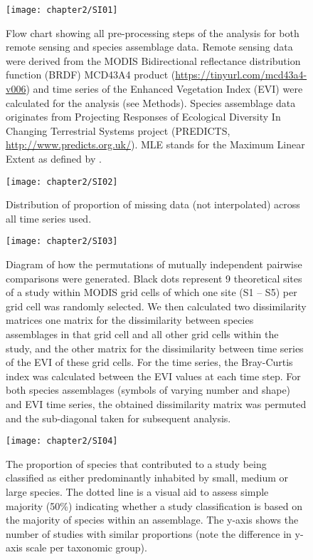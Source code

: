 \begin{figure}[h]
\centering
\texttt{[image: chapter2/SI01]}
\caption{ Flow chart showing all pre-processing steps of the analysis for both remote sensing and species assemblage data. Remote sensing data were derived from the MODIS Bidirectional reflectance distribution function (BRDF) MCD43A4 product (\href{https://tinyurl.com/mcd43a4-v006}{https://tinyurl.com/mcd43a4-v006}) and time series of the Enhanced Vegetation Index (EVI) were calculated for the analysis (see Methods). Species assemblage data originates from Projecting Responses of Ecological Diversity In Changing Terrestrial Systems project (PREDICTS, \href{http://www.predicts.org.uk/}{http://www.predicts.org.uk/}). MLE stands for the Maximum Linear Extent as defined by \citep{Hudson2016}.}
\label{SI02_01}
\end{figure}

\begin{figure}[h]
\centering
\texttt{[image: chapter2/SI02]}
\caption{ Distribution of proportion of missing data (not interpolated) across all time series used. }
\label{SI02_02}
\end{figure}

\begin{figure}[h]
\centering
\texttt{[image: chapter2/SI03]}
\caption{ Diagram of how the permutations of mutually independent pairwise comparisons were generated. Black dots represent 9 theoretical sites of a study within MODIS grid cells of which one site (S1 – S5) per grid cell was randomly selected. We then calculated two dissimilarity matrices one matrix for the dissimilarity between species assemblages in that grid cell and all other grid cells within the study, and the other matrix for the dissimilarity between time series of the EVI of these grid cells.  For the time series, the Bray-Curtis index was calculated between the EVI values at each time step. For both species assemblages (symbols of varying number and shape) and EVI time series, the obtained dissimilarity matrix was permuted and the sub-diagonal taken for subsequent analysis. }
\label{SI02_03}
\end{figure}

\begin{figure}[h]
\centering
\texttt{[image: chapter2/SI04]}
\caption{ The proportion of species that contributed to a study being classified as either predominantly inhabited by small, medium or large species. The dotted line is a visual aid to assess simple majority (50\%) indicating whether a study classification is based on the majority of species within an assemblage. The y-axis shows the number of studies with similar proportions (note the difference in y-axis scale per taxonomic group). }
\label{SI02_04}
\end{figure}

